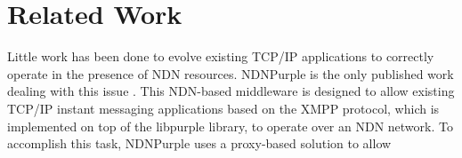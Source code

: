 \section{Related Work}
Little work has been done to evolve existing TCP/IP applications to correctly operate in the presence of NDN resources. NDNPurple is the only published work dealing with this issue \cite{wang2010implementing}. This NDN-based middleware is designed to allow existing TCP/IP instant messaging applications based on the XMPP protocol, which is implemented on top of the libpurple library, to operate over an NDN network. To accomplish this task, NDNPurple uses a proxy-based solution to allow 


